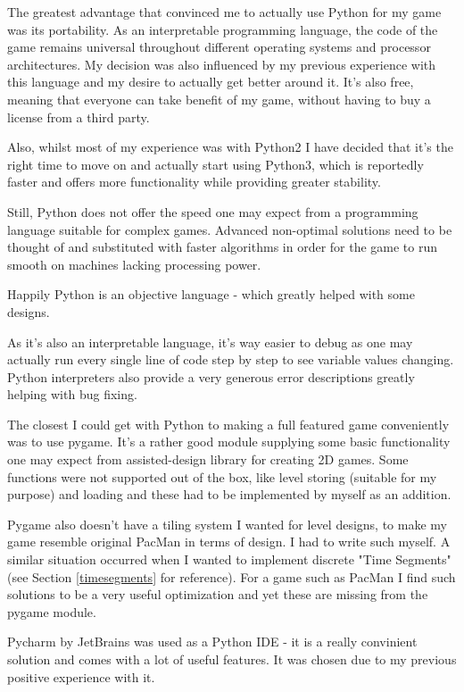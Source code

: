 \documentclass[11pt,a4paper,notitlepage]{report}
\begin{document}
			The greatest advantage that convinced me to actually use Python for my game was its portability. As an interpretable programming language, the code of the game remains universal throughout different operating systems and processor architectures. My decision was also influenced by my previous experience with this language and my desire to actually get better around it. It's also free, meaning that everyone can take benefit of my game, without having to buy a license from a third party.
			
			Also, whilst most of my experience was with Python2 I have decided that it's the right time to move on and actually start using Python3, which is reportedly faster and offers more functionality while providing greater stability.
			
			Still, Python does not offer the speed one may expect from a programming language suitable for complex games. Advanced non-optimal solutions need to be thought of and substituted with faster algorithms in order for the game to run smooth on machines lacking processing power.
			
			Happily Python is an objective language - which greatly helped with some designs.
			
			As it's also an interpretable language, it's way easier to debug as one may actually run every single line of code step by step to see variable values changing. Python interpreters also provide a very generous error descriptions greatly helping with bug fixing. 
			
			The closest I could get with Python to making a full featured game conveniently was to use pygame. It's a rather good module supplying some basic functionality one may expect from assisted-design library for creating 2D games. Some functions were not supported out of the box, like level storing (suitable for my purpose) and loading and these had to be implemented by myself as an addition.
			
			Pygame also doesn't have a tiling system I wanted for level designs, to make my game resemble original PacMan in terms of design. I had to write such myself. A similar situation occurred when I wanted to implement discrete "Time Segments" (see Section \ref{timesegments} for reference). For a game such as PacMan I find such solutions to be a very useful optimization and yet these are missing from the pygame module.
			
			Pycharm by JetBrains was used as a Python IDE - it is a really convinient solution and comes with a lot of useful features. It was chosen due to my previous positive experience with it.
			
\end{document}
